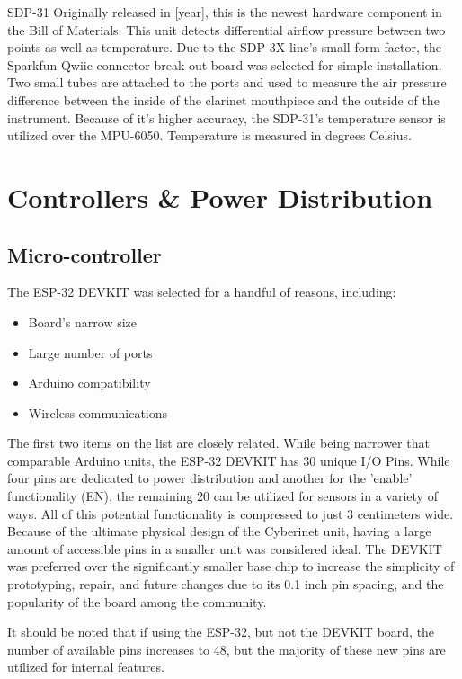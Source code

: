 SDP-31
Originally released in [year], this is the newest hardware component in the Bill of Materials. This unit detects differential airflow pressure between two points as well as temperature. Due to the SDP-3X line’s small form factor, the Sparkfun Qwiic connector break out board was selected for simple installation. Two small tubes are attached to the ports and used to measure the air pressure difference between the inside of the clarinet mouthpiece and the outside of the instrument.
Because of it’s higher accuracy, the SDP-31’s temperature sensor is utilized over the MPU-6050. Temperature is measured in degrees Celsius.



\section{Controllers \& Power Distribution}

\subsection{Micro-controller}
The ESP-32 DEVKIT was selected for a handful of reasons, including:

\begin{itemize}
    \item Board's narrow size
    \item Large number of ports
    \item Arduino compatibility
    \item Wireless communications
\end{itemize}

The first two items on the list are closely related. While being narrower that comparable Arduino units, the ESP-32 DEVKIT has 30 unique I/O Pins. While four pins are dedicated to power distribution and another for the 'enable' functionality (EN), the remaining 20 can be utilized for sensors in a variety of ways. All of this potential functionality is compressed to just 3 centimeters wide. Because of the ultimate physical design of the Cyberinet unit, having a large amount of accessible pins in a smaller unit was considered ideal. The DEVKIT was preferred over the significantly smaller base chip to increase the simplicity of prototyping, repair, and future changes due to its 0.1 inch pin spacing, and the popularity of the board among the community.

It should be noted that if using the ESP-32, but not the DEVKIT board, the number of available pins increases to 48, but the majority of these new pins are utilized for internal features. 

